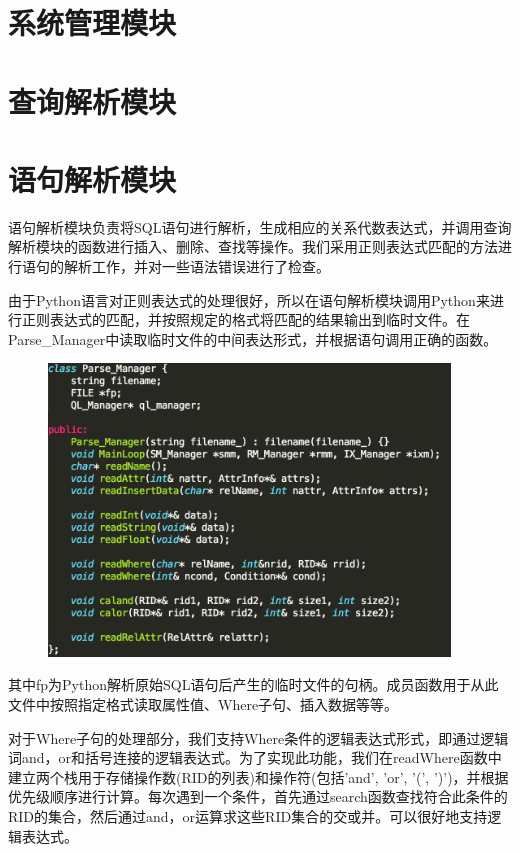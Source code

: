 \section{系统管理模块}

\section{查询解析模块}

\section{语句解析模块}

语句解析模块负责将SQL语句进行解析，生成相应的关系代数表达式，并调用查询解析模块的函数进行插入、删除、查找等操作。我们采用正则表达式匹配的方法进行语句的解析工作，并对一些语法错误进行了检查。

由于Python语言对正则表达式的处理很好，所以在语句解析模块调用Python来进行正则表达式的匹配，并按照规定的格式将匹配的结果输出到临时文件。在Parse\_Manager中读取临时文件的中间表达形式，并根据语句调用正确的函数。

\begin{figure}[H]
\centering
\includegraphics[width=4.2in]{Figures/Parse_manager.png}
\end{figure}

其中fp为Python解析原始SQL语句后产生的临时文件的句柄。成员函数用于从此文件中按照指定格式读取属性值、Where子句、插入数据等等。

对于Where子句的处理部分，我们支持Where条件的逻辑表达式形式，即通过逻辑词and，or和括号连接的逻辑表达式。为了实现此功能，我们在readWhere函数中建立两个栈用于存储操作数(RID的列表)和操作符(包括'and', 'or', '(', ')')，并根据优先级顺序进行计算。每次遇到一个条件，首先通过search函数查找符合此条件的RID的集合，然后通过and，or运算求这些RID集合的交或并。可以很好地支持逻辑表达式。

